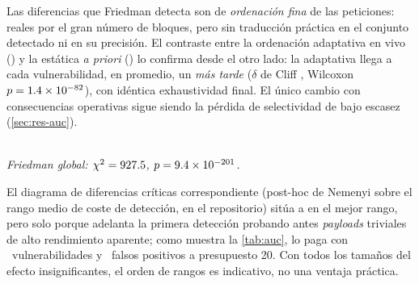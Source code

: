 Las diferencias que Friedman detecta son de \emph{ordenación fina} de las
peticiones: reales por el gran número de bloques, pero sin traducción práctica
en el conjunto detectado ni en su precisión. El contraste entre la ordenación
adaptativa en vivo () y la estática \emph{a priori}
() lo confirma desde el otro lado: la adaptativa
llega a cada vulnerabilidad, en promedio, un \ValorAdaptivePctLento{}
\emph{más tarde} ($\delta$ de Cliff \ValorAdaptiveCliff{}, Wilcoxon
$p = \num{1.4e-82}{}$), con idéntica exhaustividad final. El único cambio con
consecuencias operativas sigue siendo la pérdida de selectividad de
 bajo escasez (\cref{sec:res-auc}).

\begin{table}[t]
  \centering
  \caption{Pruebas sobre el coste de detección por instancia, 
  frente a cada ablación (bloque agrupado, $n = \ValorFriedmanN{}$). Wilcoxon
  con corrección de Benjamini--Hochberg; $p_{\text{Nem.}}$ del post-hoc de
  Nemenyi; $\delta$ de Cliff como tamaño del efecto. Fuente:
  .}
  \label{tab:stats}
  \footnotesize
  \setlength{\tabcolsep}{4pt}
  \\[2pt]
  \footnotesize\emph{Friedman global: $\chi^2 = \num{927.5}{}$,
  $p = \num{9.4e-201}{}$.}
\end{table}

El diagrama de diferencias críticas correspondiente (post-hoc de Nemenyi sobre
el rango medio de coste de detección,  en el
repositorio) sitúa a  en el mejor rango, pero solo porque
adelanta la primera detección probando antes \emph{payloads} triviales de alto
rendimiento aparente; como muestra la \cref{tab:auc}, lo paga con
\NoPriorityVulnPerdidas{}~vulnerabilidades y \NoPriorityFPnuevos{}~falsos
positivos a presupuesto \num{20}. Con todos los tamaños del efecto
insignificantes, el orden de rangos es indicativo, no una ventaja práctica.

